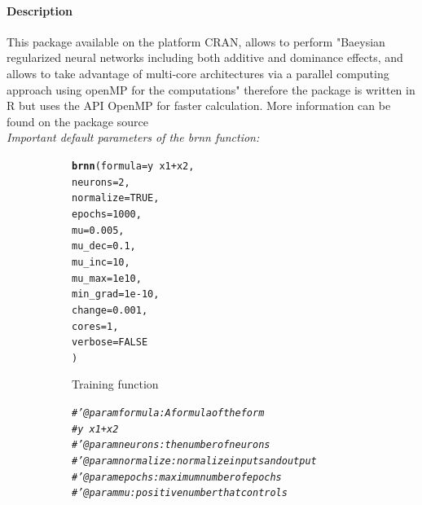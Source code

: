 \documentclass[letter,8pt]{article}\usepackage[]{graphicx}\usepackage[]{color}
\makeatletter
\newcommand{\hlnum}[1]{\textcolor[rgb]{0.686,0.059,0.569}{#1}}%
\newcommand{\hlcom}[1]{\textcolor[rgb]{0.678,0.584,0.686}{\textit{#1}}}%
\newcommand{\hlopt}[1]{\textcolor[rgb]{0,0,0}{#1}}%
\newcommand{\hlstd}[1]{\textcolor[rgb]{0.345,0.345,0.345}{#1}}%
\newcommand{\hlkwc}[1]{\textcolor[rgb]{0.333,0.667,0.333}{#1}}%
\newcommand{\hlkwd}[1]{\textcolor[rgb]{0.737,0.353,0.396}{\textbf{#1}}}%
\newenvironment{kframe}{%
 \def\at@end@of@kframe{}%
 \ifinner\ifhmode%
  \def\at@end@of@kframe{\end{minipage}}%
  \begin{minipage}{\columnwidth}%
 \fi\fi%
 \def\FrameCommand##1{\hskip\@totalleftmargin \hskip-\fboxsep
 \colorbox{shadecolor}{##1}\hskip-\fboxsep
     \hskip-\linewidth \hskip-\@totalleftmargin \hskip\columnwidth}%
 \MakeFramed {\advance\hsize-\width
   \@totalleftmargin\z@ \linewidth\hsize
   \@setminipage}}%
 {\par\unskip\endMakeFramed%
 \at@end@of@kframe}
\newenvironment{knitrout}{}{} %
\makeatother
\begin{document}
\paragraph{Description}
This package available on the platform CRAN, allows to perform "Baeysian regularized neural networks including both additive and dominance effects, and allows to take advantage of multi-core architectures via a parallel computing approach using openMP for the computations" \cite{brnnarticle} therefore the package is written in R but uses the API OpenMP for faster calculation. More information can be found on the package source \cite{brnn2020}\\
\textit{Important default parameters of the brnn function:}
\begin{figure}[H]
  \begin{subfigure}{0.5\textwidth}
\begin{knitrout}
\color{fgcolor}\begin{kframe}
\begin{alltt}
\hlkwd{brnn}\hlstd{(}\hlkwc{formula}\hlstd{=  y} \hlopt{~} \hlstd{x1} \hlopt{+} \hlstd{x2,}
      \hlkwc{neurons}\hlstd{=}\hlnum{2}\hlstd{,}
      \hlkwc{normalize}\hlstd{=}\hlnum{TRUE}\hlstd{,}
      \hlkwc{epochs}\hlstd{=}\hlnum{1000}\hlstd{,}
      \hlkwc{mu}\hlstd{=}\hlnum{0.005}\hlstd{,}
      \hlkwc{mu_dec}\hlstd{=}\hlnum{0.1}\hlstd{,}
      \hlkwc{mu_inc}\hlstd{=}\hlnum{10}\hlstd{,}
      \hlkwc{mu_max}\hlstd{=}\hlnum{1e10}\hlstd{,}
      \hlkwc{min_grad}\hlstd{=}\hlnum{1e-10}\hlstd{,}
      \hlkwc{change} \hlstd{=} \hlnum{0.001}\hlstd{,}
      \hlkwc{cores}\hlstd{=}\hlnum{1}\hlstd{,}
      \hlkwc{verbose}\hlstd{=}\hlnum{FALSE}
     \hlstd{)}
\end{alltt}
\end{kframe}
\end{knitrout}
    \caption{Training function}
  \end{subfigure}
  \begin{subfigure}{0.5\textwidth}
    \centering
\begin{knitrout}
\color{fgcolor}\begin{kframe}
\begin{alltt}
\hlcom{#' @param formula : A formula of the form }
\hlcom{#         y ~ x1 + x2}
\hlcom{#' @param neurons : the number of neurons}
\hlcom{#' @param normalize : normalize inputs and output}
\hlcom{#' @param epochs : maximum number of epochs}
\hlcom{#' @param mu : positive number that controls }

\end{alltt}
\end{kframe}
\end{knitrout}
\end{subfigure}
\end{figure}
\end{document}
